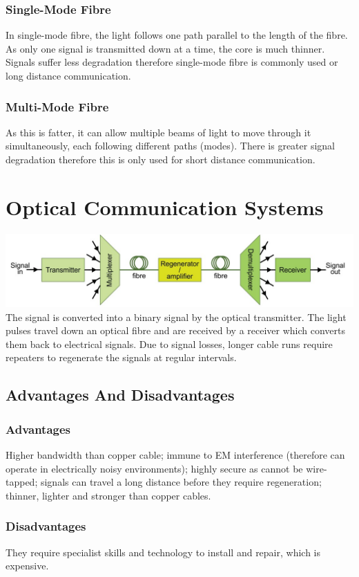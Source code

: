 \documentclass[a4paper,11pt, twocolumn]{article}
\begin{document}
\subsubsection{Single-Mode Fibre}
In single-mode fibre, the light follows one path parallel to the length of the fibre. As only one signal is transmitted down at a time, the core is much thinner. Signals suffer less degradation therefore single-mode fibre is commonly used or long distance communication.
\subsubsection{Multi-Mode Fibre}
As this is fatter, it can allow multiple beams of light to move through it simultaneously, each following different paths (modes). There is greater signal degradation therefore this is only used for short distance communication.

\section{Optical Communication Systems}
\includegraphics[width=\linewidth]{opticalCommSystems.jpg}\\
The signal is converted into a binary signal by the optical transmitter. The light pulses travel down an optical fibre and are received by a receiver which converts them back to electrical signals. Due to signal losses, longer cable runs require repeaters to regenerate the signals at regular intervals.
\subsection{Advantages And Disadvantages}
\subsubsection{Advantages}
Higher bandwidth than copper cable; immune to EM interference (therefore can operate in electrically noisy environments); highly secure as cannot be wire-tapped; signals can travel a long distance before they require regeneration; thinner, lighter and stronger than copper cables.
\subsubsection{Disadvantages}
They require specialist skills and technology to install and repair, which is expensive.
\end{document}
